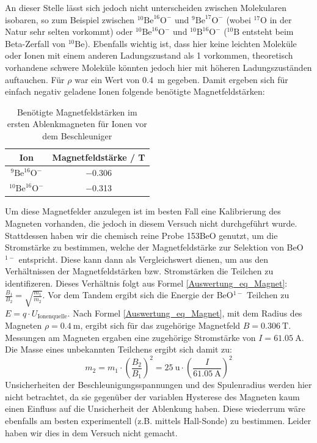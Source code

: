 An dieser Stelle lässt sich jedoch nicht unterscheiden zwischen Molekularen isobaren, so zum Beispiel zwischen $^{10}\text{Be}^{16}\text{O}^{-}$ und $^{9}\text{Be}^{17}\text{O}^{-}$ (wobei $^{17}\text{O}$ in der Natur sehr selten vorkommt) oder $^{10}\text{Be}^{16}\text{O}^{-}$ und $^{10}\text{B}^{16}\text{O}^{-}$ ($^{10}\text{B}$ entsteht beim Beta-Zerfall von $^{10}\text{Be}$).
Ebenfalls wichtig ist, dass hier keine leichten Moleküle oder Ionen mit einem anderen Ladungszustand als 1 vorkommen, theoretisch vorhandene schwere Moleküle könnten jedoch hier mit höheren Ladungszuständen auftauchen.
Für $\rho$ war ein Wert von \SI{0.4}{\metre} gegeben.
Damit ergeben sich für einfach negativ geladene Ionen folgende benötigte Magnetfeldstärken:
\begin{table}[H]
  \centering
  \caption{Benötigte Magnetfeldstärken im ersten Ablenkmagneten für Ionen vor dem Beschleuniger}
  \begin{tabular}{|c|c|}
    \hline
    Ion & Magnetfeldstärke / \si{\tesla} \\
    \hline
    $^{9}\text{Be}^{16}\text{O}^{-}$ & \num{-0.306} \\
    \hline
    $^{10}\text{Be}^{16}\text{O}^{-}$ & \num{-0.313} \\
    \hline
  \end{tabular}
  \label{Auswertung_tab_Ionenenergien_vor_Besch}
\end{table}
Um diese Magnetfelder anzulegen ist im besten Fall eine Kalibrierung des Magneten vorhanden, die jedoch in diesem Versuch nicht durchgeführt wurde.
Stattdessen haben wir die chemisch reine Probe 153BeO genutzt, um die Stromstärke zu bestimmen, welche der Magnetfeldstärke zur Selektion von BeO$^{1-}$ entspricht.
Diese kann dann als Vergleichswert dienen, um aus den Verhältnissen der Magnetfeldstärken bzw. Stromstärken die Teilchen zu identifizeren.
Dieses Verhältnis folgt aus Formel \ref{Auswertung_eq_Magnet}: $\frac{B_1}{B_2} = \sqrt{\frac{m_1}{m_2}}$.
Vor dem Tandem ergibt sich die Energie der BeO$^{1-}$ Teilchen zu $E = q \cdot U_{\text{Ionenquelle}}$.
Nach Formel \ref{Auswertung_eq_Magnet}, mit dem Radius des Magneten $\rho = \SI{0.4}{\metre}$, ergibt sich für das zugehörige Magnetfeld $B = \SI{0.306}{\tesla}$.
Messungen am Magneten ergaben eine zugehörige Stromstärke von $I = \SI{61.05}{\ampere}$.
Die Masse eines unbekannten Teilchens ergibt sich damit zu:
\begin{equation}
    m_2 = m_1 \cdot \left( \frac{B_2}{B_1} \right)^{2} = \SI{25}{\atomicmassunit} \cdot \left (\frac{I}{\SI{61.05}{\ampere}}\right )^{2}
    \label{Auswertung_LE_masse}
\end{equation}
Unsicherheiten der Beschleunigungsspannungen und des Spulenradius werden hier nicht betrachtet, da sie gegenüber der variablen Hysterese des Magneten kaum einen Einfluss auf die Unsicherheit der Ablenkung haben.
Diese wiederrum wäre ebenfalls am besten experimentell (z.B. mittels Hall-Sonde) zu bestimmen.
Leider haben wir dies in dem Versuch nicht gemacht.


